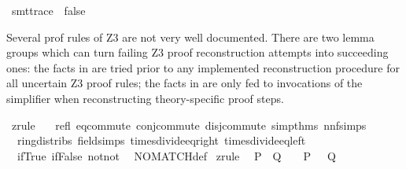 \begin{isabellebody}
\begin{isamarkuptext}
\end{isamarkuptext}\isamarkuptrue%
\isamarkupfalse%
\ {\isacharbrackleft}{\kern0pt}{\isacharbrackleft}{\kern0pt}smt{\isacharunderscore}{\kern0pt}trace\ {\isacharequal}{\kern0pt}\ false{\isacharbrackright}{\kern0pt}{\isacharbrackright}{\kern0pt}%
\isadelimdocument
%
\endisadelimdocument
%
\isatagdocument
%
\isamarkuptrue%
%
\endisatagdocument
{\isafolddocument}%
%
\isadelimdocument
%
\endisadelimdocument
%
\begin{isamarkuptext}%
Several prof rules of Z3 are not very well documented. There are two
lemma groups which can turn failing Z3 proof reconstruction attempts
into succeeding ones: the facts in  are tried prior to
any implemented reconstruction procedure for all uncertain Z3 proof
rules;  the facts in  are only fed to invocations of
the simplifier when reconstructing theory-specific proof steps.%
\end{isamarkuptext}\isamarkuptrue%
\isamarkupfalse%
\ {\isacharbrackleft}{\kern0pt}z{}{\isacharunderscore}{\kern0pt}rule{\isacharbrackright}{\kern0pt}\ {\isacharequal}{\kern0pt}\isanewline
\ \ refl\ eq{\isacharunderscore}{\kern0pt}commute\ conj{\isacharunderscore}{\kern0pt}commute\ disj{\isacharunderscore}{\kern0pt}commute\ simp{\isacharunderscore}{\kern0pt}thms\ nnf{\isacharunderscore}{\kern0pt}simps\isanewline
\ \ ring{\isacharunderscore}{\kern0pt}distribs\ field{\isacharunderscore}{\kern0pt}simps\ times{\isacharunderscore}{\kern0pt}divide{\isacharunderscore}{\kern0pt}eq{\isacharunderscore}{\kern0pt}right\ times{\isacharunderscore}{\kern0pt}divide{\isacharunderscore}{\kern0pt}eq{\isacharunderscore}{\kern0pt}left\isanewline
\ \ if{\isacharunderscore}{\kern0pt}True\ if{\isacharunderscore}{\kern0pt}False\ not{\isacharunderscore}{\kern0pt}not\isanewline
\ \ NO{\isacharunderscore}{\kern0pt}MATCH{\isacharunderscore}{\kern0pt}def\isanewline
\isanewline
{}\isamarkupfalse%
\ {\isacharbrackleft}{\kern0pt}z{}{\isacharunderscore}{\kern0pt}rule{\isacharbrackright}{\kern0pt}{\isacharcolon}{\kern0pt}\isanewline
\ \ {\isachardoublequoteopen}{\isacharparenleft}{\kern0pt}P\ {\isasymand}\ Q{\isacharparenright}{\kern0pt}\ {\isacharequal}{\kern0pt}\ {\isacharparenleft}{\kern0pt}{\isasymnot}\ {\isacharparenleft}{\kern0pt}{\isasymnot}\ P\ {\isasymor}\ {\isasymnot}\ Q{\isacharparenright}{\kern0pt}{\isacharparenright}{\kern0pt}{\isachardoublequoteclose}\isanewline

\end{isabellebody}

